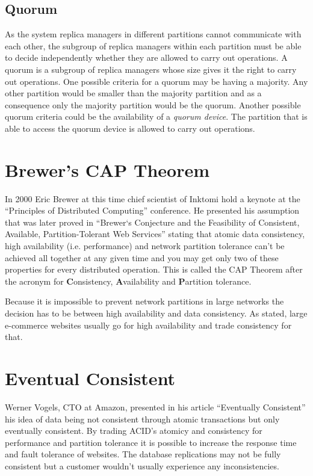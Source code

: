 \subsection{Quorum}

As the system replica managers in different partitions cannot
communicate with each other, the subgroup of replica managers
within each partition must be able to decide independently whether
they are allowed to carry out operations. A quorum is a subgroup of
replica managers whose size gives it the right to carry out
operations. \cite{Coulouris} One possible criteria for a
quorum may be having a majority. Any other partition would be
smaller than the majority partition and as a consequence only the
majority partition would be the quorum. Another possible quorum
criteria could be the availability of a \emph{quorum device}. The
partition that is able to access the quorum device is allowed to
carry out operations.

\section{Brewer's CAP Theorem}

In 2000 Eric Brewer at this time chief scientist of Inktomi hold a
keynote at the ``Principles of Distributed Computing'' conference.
He presented his assumption that was later proved in
``Brewer‘s Conjecture and the Feasibility of Consistent, Available, Partition-Tolerant Web Services''
stating that atomic data consistency, high availability (i.e.
performance) and network partition tolerance can't be achieved all
together at any given time and you may get only two of these
properties for every distributed operation. This is called the CAP
Theorem after the acronym for \textbf{C}onsistency,
\textbf{A}vailability and \textbf{P}artition tolerance.

Because it is impossible to prevent network partitions in large
networks the decision has to be between high availability and data
consistency. As stated, large e-commerce websites usually go for
high availability and trade consistency for that.

\section{Eventual Consistent}

Werner Vogels, CTO at Amazon, presented in his article
``Eventually Consistent'' \cite{vogels}
his idea of data being not consistent through atomic transactions
but only eventually consistent. By trading ACID's atomicy and
consistency for performance and partition tolerance it is possible
to increase the response time and fault tolerance of websites. The
database replications may not be fully consistent but a customer
wouldn't usually experience any inconsistencies.

